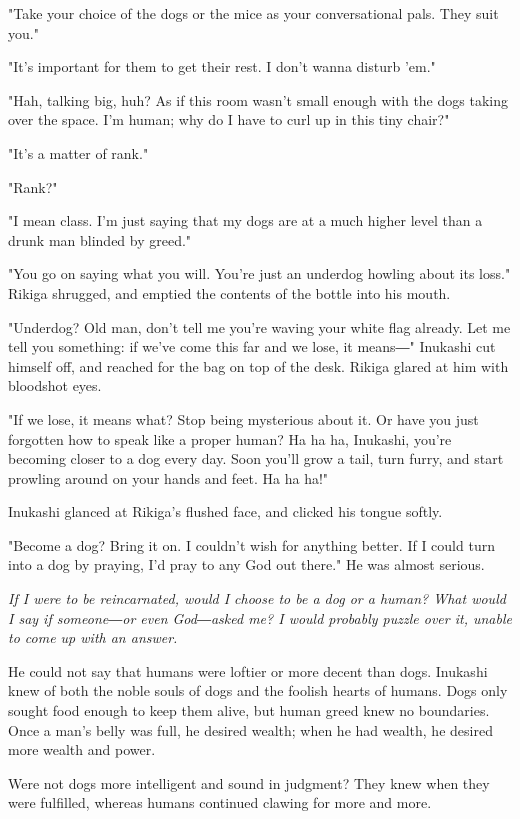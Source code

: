 "Take your choice of the dogs or the mice as your conversational pals.
They suit you."

"It's important for them to get their rest. I don't wanna disturb 'em."

"Hah, talking big, huh? As if this room wasn't small enough with the
dogs taking over the space. I'm human; why do I have to curl up in this
tiny chair?"

"It's a matter of rank."

"Rank?"

"I mean class. I'm just saying that my dogs are at a much higher level
than a drunk man blinded by greed."

"You go on saying what you will. You're just an underdog howling about
its loss." Rikiga shrugged, and emptied the contents of the bottle into
his mouth.

"Underdog? Old man, don't tell me you're waving your white flag already.
Let me tell you something: if we've come this far and we lose, it
means―" Inukashi cut himself off, and reached for the bag on top of the
desk. Rikiga glared at him with bloodshot eyes.

"If we lose, it means what? Stop being mysterious about it. Or have you
just forgotten how to speak like a proper human? Ha ha ha, Inukashi,
you're becoming closer to a dog every day. Soon you'll grow a tail, turn
furry, and start prowling around on your hands and feet. Ha ha ha!"

Inukashi glanced at Rikiga's flushed face, and clicked his tongue
softly.

"Become a dog? Bring it on. I couldn't wish for anything better. If I
could turn into a dog by praying, I'd pray to any God out there." He was
almost serious.

\emph{If I were to be reincarnated, would I choose to be a dog or a human?
	What would I say if someone―or even God―asked me? I would probably
	puzzle over it, unable to come up with an answer.}

He could not say that humans were loftier or more decent than dogs.
Inukashi knew of both the noble souls of dogs and the foolish hearts of
humans. Dogs only sought food enough to keep them alive, but human greed
knew no boundaries. Once a man's belly was full, he desired wealth; when
he had wealth, he desired more wealth and power.

Were not dogs more intelligent and sound in judgment? They knew when
they were fulfilled, whereas humans continued clawing for more and more.

